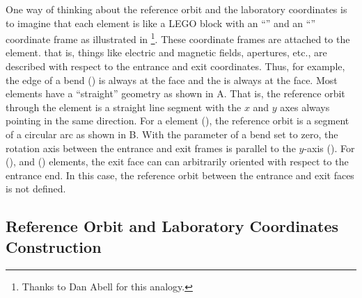 
One way of thinking about the reference orbit and the laboratory coordinates is to imagine that each
element is like a LEGO block with an ``'' and an ``'' coordinate frame as
illustrated in \footnote
  {
Thanks to Dan Abell for this analogy.
  }. 
These coordinate frames are attached to the element. that is, things like electric and magnetic
fields, apertures, etc., are described with respect to the entrance and exit coordinates.  Thus, for
example, the  edge of a bend () is always at the  face and the
 is always at the  face. Most elements have a ``straight'' geometry as shown in
A. That is, the reference orbit through the element is a straight line
segment with the $x$ and $y$ axes always pointing in the same direction.  For a  element
(), the reference orbit is a segment of a circular arc as shown in
B. With the  parameter of a bend set to zero, the rotation axis
between the entrance and exit frames is parallel to the $y$-axis (). For 
(), and  () elements, the exit face can can
arbitrarily oriented with respect to the entrance end. In this case, the reference orbit between the
entrance and exit faces is not defined.

\subsection{Reference Orbit and Laboratory Coordinates Construction}
\label{s:ref.construct}

